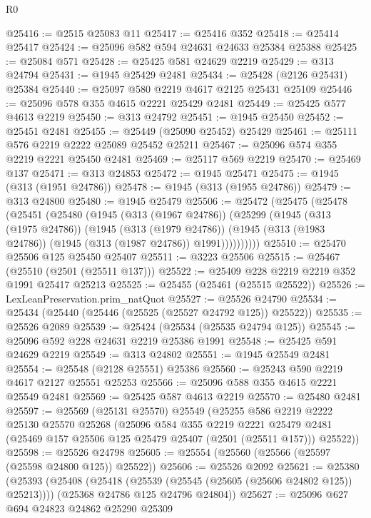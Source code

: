 \begin{lexlean}{R0}
\begin{coremodule}
@25416 := @2515 @25083 @11
@25417 := @25416 @352
@25418 := @25414 @25417
@25424 := @25096 @582 @594 @24631 @24633 @25384 @25388
@25425 := @25084 @571
@25428 := @25425 @581 @24629 @2219
@25429 := @313 @24794
@25431 := @1945 @25429 @2481
@25434 := @25428 (@2126 @25431) @25384
@25440 := @25097 @580 @2219 @4617 @2125 @25431 @25109
@25446 := @25096 @578 @355 @4615 @2221 @25429 @2481
@25449 := @25425 @577 @4613 @2219
@25450 := @313 @24792
@25451 := @1945 @25450
@25452 := @25451 @2481
@25455 := @25449 (@25090 @25452) @25429
@25461 := @25111 @576 @2219 @2222 @25089 @25452 @25211
@25467 := @25096 @574 @355 @2219 @2221 @25450 @2481
@25469 := @25117 @569 @2219
@25470 := @25469 @137
@25471 := @313 @24853
@25472 := @1945 @25471
@25475 := @1945 (@313 (@1951 @24786))
@25478 := @1945 (@313 (@1955 @24786))
@25479 := @313 @24800
@25480 := @1945 @25479
@25506 := @25472
    (@25475
      (@25478
        (@25451
          (@25480
            (@1945
              (@313 (@1967 @24786))
              (@25299
                (@1945
                  (@313 (@1975 @24786))
                  (@1945
                    (@313 (@1979 @24786))
                    (@1945 (@313 (@1983 @24786)) (@1945 (@313 (@1987 @24786)) @1991))))))))))
@25510 := @25470 @25506 @125 @25450 @25407
@25511 := @3223 @25506
@25515 := @25467 (@25510 (@2501 (@25511 @137)))
@25522 := @25409 @228 @2219 @2219 @352 @1991 @25417 @25213
@25525 := @25455 (@25461 (@25515 @25522))
@25526 := LexLeanPreservation.prim_natQuot
@25527 := @25526 @24790
@25534 := @25434 (@25440 (@25446 (@25525 (@25527 @24792 @125)) @25522))
@25535 := @25526 @2089
@25539 := @25424 (@25534 (@25535 @24794 @125))
@25545 := @25096 @592 @228 @24631 @2219 @25386 @1991
@25548 := @25425 @591 @24629 @2219
@25549 := @313 @24802
@25551 := @1945 @25549 @2481
@25554 := @25548 (@2128 @25551) @25386
@25560 := @25243 @590 @2219 @4617 @2127 @25551 @25253
@25566 := @25096 @588 @355 @4615 @2221 @25549 @2481
@25569 := @25425 @587 @4613 @2219
@25570 := @25480 @2481
@25597 := @25569
    (@25131 @25570)
    @25549
    (@25255
      @586
      @2219
      @2222
      @25130
      @25570
      @25268
      (@25096
        @584
        @355
        @2219
        @2221
        @25479
        @2481
        (@25469 @157 @25506 @125 @25479 @25407 (@2501 (@25511 @157)))
        @25522))
@25598 := @25526 @24798
@25605 := @25554 (@25560 (@25566 (@25597 (@25598 @24800 @125)) @25522))
@25606 := @25526 @2092
@25621 := @25380
    (@25393
      (@25408 (@25418 (@25539 (@25545 (@25605 (@25606 @24802 @125)) @25213))))
      (@25368 @24786 @125 @24796 @24804))
@25627 := @25096 @627 @694 @24823 @24862 @25290 @25309

\end{coremodule}
\end{lexlean}

